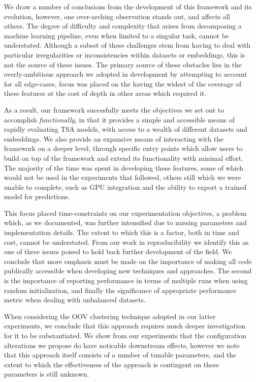 \documentclass[../../fyp.tex]{subfiles}
\begin{document}
We draw a number of conclusions from the development of this framework and its evolution, however, one over-arching observation stands out, and affects all others. The degree of difficulty and complexity that arises from decomposing a machine learning pipeline, even when limited to a singular task, cannot be understated. Although a subset of these challenges stem from having to deal with particular irregularities or inconsistencies within datasets or embeddings, this is not the source of these issues. The primary source of these obstacles lies in the overly-ambitious approach we adopted in development by attempting to account for all edge-cases, focus was placed on the having the widest of the coverage of these features at the cost of depth in other areas which required it. 

As a result, our framework succesfully meets the objectives we set out to accomplish \textit{functionally}, in that it provides a simple and accessible means of rapidly evaluating TSA models, with access to a wealth of different datasets and embeddings. We also provide an expansive means of interacting with the framework on a deeper level, through specific entry points which allow users to build on top of the framework and extend its functionality with minimal effort. The majority of the time was spent in developing these features, some of which would not be used in the experiments that followed, others still which we were unable to complete, such as GPU integration and the ability to export a trained model for predictions. 

This focus placed time-constraints on our experimentation objectives, a problem which, as we documented, was further intensified due to missing parameters and implementation details. The extent to which this is a factor, both in time and cost, cannot be understated. From our work in reproducibility we identify this as one of three issues poised to hold back further development of the field. We conclude that more emphasis must be made on the importance of making all code publically accessible when developing new techniques and approaches. The second is the importance of reporting performance in terms of multiple runs when using random initialization, and finally the significance of appropriate performance metric when dealing with unbalanced datasets. 

When considering the OOV clustering technique adopted in our latter experiments, we conclude that this approach requires much deeper investigation for it to be substantiated. We show from our experiments that the configuration alterations we propose do have noticable downstream effects, however we note that this approach itself consists of a number of tunable parameters, and the extent to which the effectiveness of the approach is contingent on these parameters is still unknown. 
\end{document}
